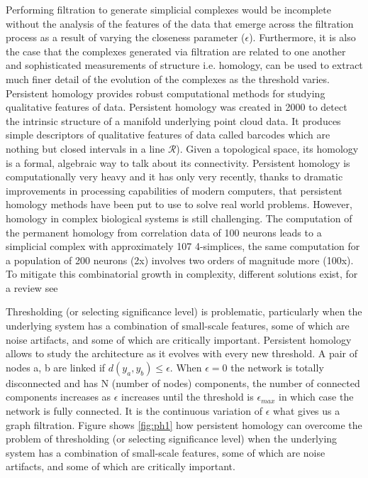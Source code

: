\documentclass[onecollarge,runningheads]{svjour2}
\begin{document}
Performing filtration to generate simplicial complexes would be incomplete without the analysis of the features of the data that emerge across the filtration process as a result of varying the closeness parameter ($\epsilon$). Furthermore, it is also the case that the complexes generated via filtration are related to one another and sophisticated measurements of structure i.e. homology, can be used to extract much finer detail of the evolution of the complexes as the threshold varies.
Persistent homology provides robust computational methods for studying qualitative features of data. Persistent homology was created in 2000 to detect the intrinsic structure of a manifold underlying point cloud data. It produces simple descriptors of qualitative features of data called barcodes which are nothing but closed intervals in a line $\mathcal{R}$). Given a topological space, its homology is a formal, algebraic way to talk about its connectivity.
Persistent homology is computationally very heavy and it has only very recently, thanks to dramatic improvements in processing capabilities of modern computers, that persistent homology methods have been put to use to solve real world problems.
However, homology in complex biological systems is still challenging. The computation of the permanent homology from correlation data of 100 neurons leads to a simplicial complex with approximately 107 4-simplices, the same computation for a population of 200 neurons (2x) involves two orders of magnitude more (100x).
To mitigate this combinatorial growth in complexity, different solutions exist, for a review see \cite{otter2015roadmap}


Thresholding (or selecting significance level) is problematic, particularly when the underlying system has a combination of small-scale features, some of which are noise artifacts, and some of which are critically important. Persistent homology allows to study the architecture as it evolves with every new threshold. A pair of nodes a, b are linked if $d(y_a, y_b) \leq \epsilon$. When $\epsilon = 0$ the network is totally disconnected and has N (number of nodes) components, the number of connected components increases as $\epsilon$ increases until the threshold is $\epsilon_{max}$ in which case the network is fully connected. It is the continuous variation of $\epsilon$ what gives us a graph filtration. Figure shows \ref{fig:ph1} how persistent homology can overcome the problem of thresholding (or selecting significance level) when the underlying system has a combination of small-scale features, some of which are noise artifacts, and some of which are critically important.
\end{document}
